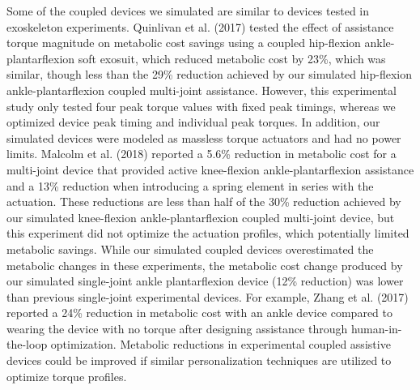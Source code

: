 \documentclass[10pt,letterpaper]{article}
\begin{document}
Some of the coupled devices we simulated are similar to devices tested in exoskeleton experiments. Quinlivan et al. (2017) tested the effect of assistance torque magnitude on metabolic cost savings using a coupled hip-flexion ankle-plantarflexion soft exosuit, which reduced metabolic cost by 23\%, which was similar, though less than the 29\% reduction achieved by our simulated hip-flexion ankle-plantarflexion coupled multi-joint assistance. However, this experimental study only tested four peak torque values with fixed peak timings, whereas we optimized device peak timing and individual peak torques. In addition, our simulated devices were modeled as massless torque actuators and had no power limits. Malcolm et al. (2018) reported a 5.6\% reduction in metabolic cost for a multi-joint device that provided active knee-flexion ankle-plantarflexion assistance and a 13\% reduction when introducing a spring element in series with the actuation. These reductions are less than half of the 30\% reduction achieved by our simulated knee-flexion ankle-plantarflexion coupled multi-joint device, but this experiment did not optimize the actuation profiles, which potentially limited metabolic savings. While our simulated coupled devices overestimated the metabolic changes in these experiments, the metabolic cost change produced by our simulated single-joint ankle plantarflexion device (12\% reduction) was lower than previous single-joint experimental devices. For example, Zhang et al. (2017) reported a 24\% reduction in metabolic cost with an ankle device compared to wearing the device with no torque after designing assistance through human-in-the-loop optimization. Metabolic reductions in experimental coupled assistive devices could be improved if similar personalization techniques are utilized to optimize torque profiles.
\end{document}
